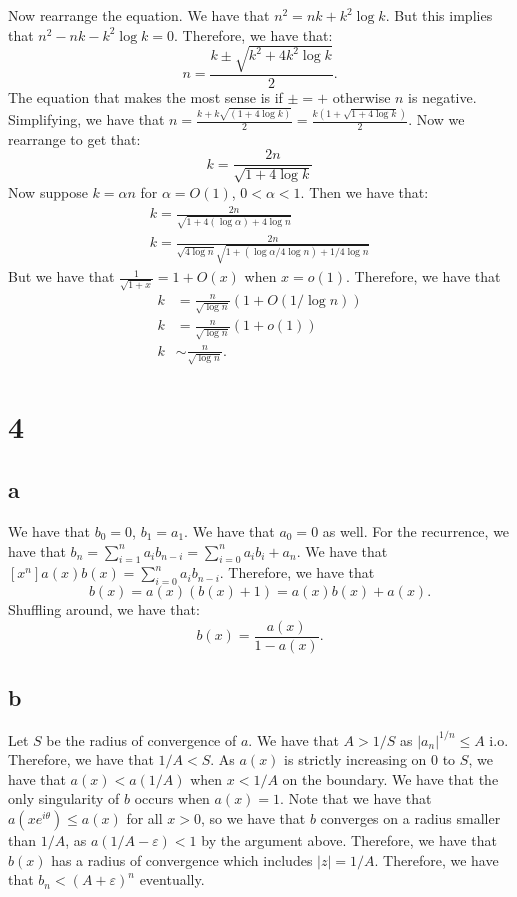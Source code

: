 \documentclass[]{article}
\begin{document}
Now rearrange the equation. We have that $n^2 = nk + k^2 \log k$. But this implies that $n^2 - nk - k^2 \log k = 0$. Therefore, we have that:
\begin{equation}
	n = \frac{k \pm \sqrt{k^2 + 4 k^2 \log k}}{2}.
\end{equation}
The equation that makes the most sense is if $\pm = +$ otherwise $n$ is negative. 
Simplifying, we have that $n = \frac{k + k \sqrt{(1 + 4\log k)}}{2} = \frac{k (1 + \sqrt{1 + 4\log k})}{2}$. Now we rearrange to get that:
\begin{equation}
	k = \frac{2n}{\sqrt{1 + 4\log k}}
\end{equation}
Now suppose $k = \alpha n$ for $\alpha = O(1)$, $0 < \alpha < 1$. 
Then we have that:
\begin{align*}
	k = \frac{2n}{\sqrt{1 + 4(\log \alpha) + 4\log n}}\\
	k = \frac{2n}{\sqrt{4\log n} \sqrt{1 + (\log \alpha/4\log n) + 1/4\log n}}
\end{align*}
But we have that $\frac{1}{\sqrt{1 + x}} = 1 + O(x)$ when $x = o(1)$. Therefore, we have that
\begin{align*}
	k &= \frac{n}{\sqrt{\log n}} \left( 1 + O(1/ \log n) \right)\\
	k &=\frac{n}{\sqrt{\log n}} (1 + o(1))\\
	k &\sim \frac{n}{\sqrt{\log n}}.
\end{align*}

\section{4}
\subsection{a}
We have that $b_0 = 0$, $b_1 = a_1$. We have that $a_0 = 0$ as well. For the recurrence, we have that $b_n = \sum_{i = 1}^{n} a_i b_{n - i} = \sum_{i = 0}^{n} a_i b_i + a_n$. We have that $[x^n]a(x) b(x) = \sum_{i = 0}^{n} a_i b_{n - i}$.  Therefore, we have that
\begin{equation}
	b(x) =  a(x)(b(x) + 1) = a(x) b(x) + a(x). 
\end{equation}
Shuffling around, we have that:
\begin{equation}
	b(x) = \frac{a(x)}{1 - a(x)}.
\end{equation}
\subsection{b}
Let $S$ be the radius of convergence of $a$. We have that $A > 1/S$ as $|a_n|^{1/n} \leq A$ i.o. Therefore, we have that $1/A < S$. As $a(x)$ is strictly increasing on $0$ to $S$, we have that $a(x) < a(1/A)$ when $x < 1/A$ on the boundary. We have that the only singularity of $b$ occurs when $a(x) = 1$. Note that we have that $a(x e^{i\theta}) \leq a(x)$ for all $x> 0$, so we have that $b$ converges on a radius smaller than $1/A$, as $a(1/A - \varepsilon) < 1$ by the argument above. Therefore, we have that $b(x)$ has a radius of convergence which includes $|z| = 1/A$. Therefore, we have that $b_n < \left(A + \varepsilon \right)^n$ eventually. 
\end{document}
